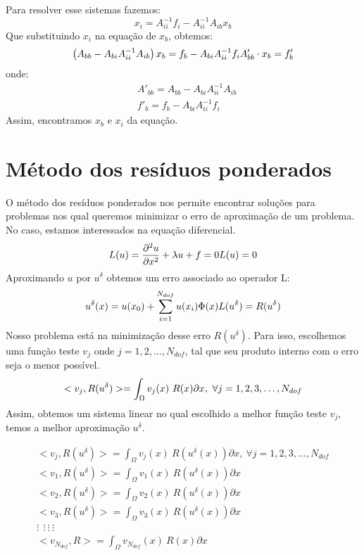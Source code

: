 Para resolver esse sistemas fazemos:
\begin{equation}
x_i = A_{ii}^{-1} f_i - A_{ii}^{-1} A_{ib} x_b
\end{equation}
Que substituindo $x_i$ na equação de  $x_b$, obtemos:
\begin{equation}
\left( A_{bb} - A_{bi}A_{ii}^{-1} A_{ib} \right) x_b = f_b - A_{bi}A_{ii}^{-1} f_i\\
A'_{bb} \cdot x_b = f'_b
\end{equation}
onde:
\begin{align}
& A'_{bb} = A_{bb} - A_{bi}A_{ii}^{-1} A_{ib}\\ 
& f'_b = f_b - A_{bi}A_{ii}^{-1} f_i
\end{align}
Assim, encontramos $x_b$ e $x_i$ da equação.



\section{Método dos resíduos ponderados}
 O método dos resíduos ponderados nos permite encontrar soluções para problemas nos qual queremos minimizar o erro de aproximação de um problema. No caso, estamos interessados na equação diferencial.
 \begin{equation}
    L(u) = \frac{\partial^2 u}{\partial x^2} + \lambda u + f = 0 \\
    L(u) = 0
 \end{equation}
 Aproximando $u$ por $u^\delta$ obtemos um erro associado ao operador L:
 \begin{equation}
 	u^\delta(x) = u(x_0) + \sum^{N_{dof}}_{i = 1} u(x_i) \Phi(x)\\
    L(u^\delta) = R(u^\delta)
\end{equation}
Nosso problema está na minimização desse erro $R(u^\delta)$. Para isso, escolhemos uma função teste $v_j$ onde $j = 1,2,\dots, N_{dof}$, tal que seu produto interno com o erro seja o menor possível.
\begin{equation}
    <v_j,R(u^\delta)> = \int_{\Omega} v_j(x)\ R(x) \partial x,\ \forall j = 1,2,3,\dots,N_{dof}\\
\end{equation}
Assim, obtemos um sistema linear no qual escolhido a melhor função teste $v_j$, temos a melhor aproximação $u^\delta$.

\begin{align}
    <v_j,R(u^\delta)> = \int_{\Omega} v_j(x)\ R(u^\delta(x)) \partial x,\ \forall j = 1,2,3,\dots,N_{dof}\\
    <v_1,R(u^\delta)> = \int_{\Omega} v_1(x)\ R(u^\delta(x)) \partial x\\
    <v_2,R(u^\delta)> = \int_{\Omega} v_2(x)\ R(u^\delta(x)) \partial x\\
    <v_3,R(u^\delta)> = \int_{\Omega} v_3(x)\ R(u^\delta(x)) \partial x\\
       \vdots \   \ \vdots \ \vdots \ \vdots  \\
    <v_{N_{dof}},R> = \int_{\Omega} v_{N_{dof}}(x)\ R(x) \partial x
\end{align}